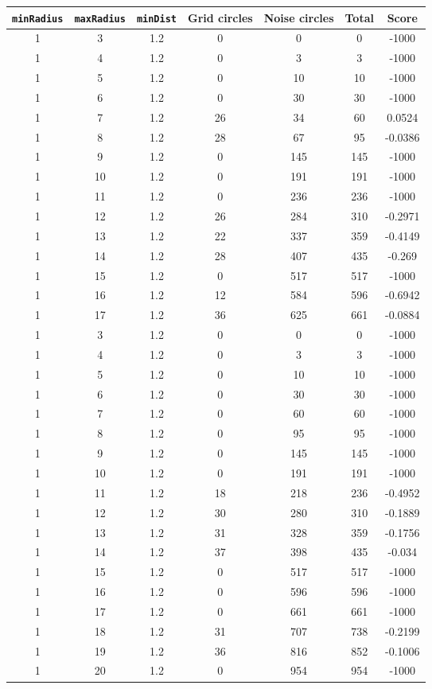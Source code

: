 \documentclass[letterpaper, 12pt]{article}
\begin{document}
\begin{longtable}{|c|c|c|c|c|c|c|}
\hline
\textbf{\texttt{minRadius}} & \textbf{\texttt{maxRadius}} & \textbf{\texttt{minDist}} & \textbf{Grid circles} & \textbf{Noise circles} & \textbf{Total} & \textbf{Score} \\
\hline
1 & 3 & 1.2 & 0 & 0 & 0 & -1000 \\
\hline
1 & 4 & 1.2 & 0 & 3 & 3 & -1000 \\
\hline
1 & 5 & 1.2 & 0 & 10 & 10 & -1000 \\
\hline
1 & 6 & 1.2 & 0 & 30 & 30 & -1000 \\
\hline
1 & 7 & 1.2 & 26 & 34 & 60 & 0.0524 \\
\hline
1 & 8 & 1.2 & 28 & 67 & 95 & -0.0386 \\
\hline
1 & 9 & 1.2 & 0 & 145 & 145 & -1000 \\
\hline
1 & 10 & 1.2 & 0 & 191 & 191 & -1000 \\
\hline
1 & 11 & 1.2 & 0 & 236 & 236 & -1000 \\
\hline
1 & 12 & 1.2 & 26 & 284 & 310 & -0.2971 \\
\hline
1 & 13 & 1.2 & 22 & 337 & 359 & -0.4149 \\
\hline
1 & 14 & 1.2 & 28 & 407 & 435 & -0.269 \\
\hline
1 & 15 & 1.2 & 0 & 517 & 517 & -1000 \\
\hline
1 & 16 & 1.2 & 12 & 584 & 596 & -0.6942 \\
\hline
1 & 17 & 1.2 & 36 & 625 & 661 & -0.0884 \\
\hline
1 & 3 & 1.2 & 0 & 0 & 0 & -1000 \\
\hline
1 & 4 & 1.2 & 0 & 3 & 3 & -1000 \\
\hline
1 & 5 & 1.2 & 0 & 10 & 10 & -1000 \\
\hline
1 & 6 & 1.2 & 0 & 30 & 30 & -1000 \\
\hline
1 & 7 & 1.2 & 0 & 60 & 60 & -1000 \\
\hline
1 & 8 & 1.2 & 0 & 95 & 95 & -1000 \\
\hline
1 & 9 & 1.2 & 0 & 145 & 145 & -1000 \\
\hline
1 & 10 & 1.2 & 0 & 191 & 191 & -1000 \\
\hline
1 & 11 & 1.2 & 18 & 218 & 236 & -0.4952 \\
\hline
1 & 12 & 1.2 & 30 & 280 & 310 & -0.1889 \\
\hline
1 & 13 & 1.2 & 31 & 328 & 359 & -0.1756 \\
\hline
1 & 14 & 1.2 & 37 & 398 & 435 & -0.034 \\
\hline
1 & 15 & 1.2 & 0 & 517 & 517 & -1000 \\
\hline
1 & 16 & 1.2 & 0 & 596 & 596 & -1000 \\
\hline
1 & 17 & 1.2 & 0 & 661 & 661 & -1000 \\
\hline
1 & 18 & 1.2 & 31 & 707 & 738 & -0.2199 \\
\hline
1 & 19 & 1.2 & 36 & 816 & 852 & -0.1006 \\
\hline
1 & 20 & 1.2 & 0 & 954 & 954 & -1000 \\
\hline
\end{longtable}
\end{document}
